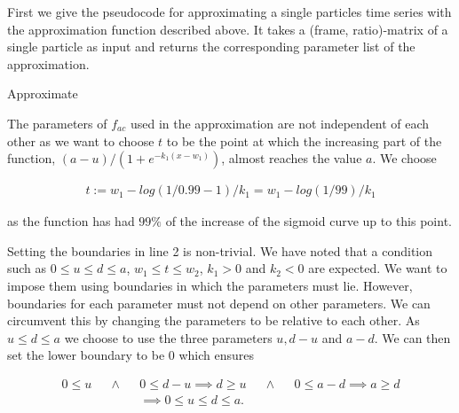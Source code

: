 First we give the pseudocode for approximating a single particles time series with the approximation function described above. It takes a (frame, ratio)-matrix of a single particle as input and returns the corresponding parameter list of the approximation.

\begin{algorithm}[H] \label{alg:approximate}
	\SetAlgoLined
	\DontPrintSemicolon
	\LinesNumbered
	\caption{Approximate}
	
	
	\BlankLine
\end{algorithm}
\vspace{1cm}

The parameters of $f_{ac}$ used in the approximation are not independent of each other as we want to choose $t$ to be the point at which the increasing part of the function, $(a-u)/(1+e^{-k_1(x-w_1)})$, almost reaches the value $a$. We choose

\begin{align*}
	t := w_1 - log(1/0.99-1) / k_1 = w_1 - log(1/99) / k_1
\end{align*}

as the function has had $99\%$ of the increase of the sigmoid curve up to this point.

Setting the boundaries in line 2 is non-trivial. We have noted that a condition such as $0 \leq u \leq d \leq a$, $w_1 \leq t \leq w_2$, $k_1 > 0$ and $k_2 < 0$ are expected. We want to impose them using boundaries in which the parameters must lie. However, boundaries for each parameter must not depend on other parameters. We can circumvent this by changing the parameters to be relative to each other. As $u \leq d \leq a$ we choose to use the three parameters $u, d-u$ and $a-d$. We can then set the lower boundary to be $0$ which ensures

\begin{align*}
	0 \leq u &&\land &&0 \leq d - u \implies d \geq u &&\land &&0 \leq a - d \implies a \geq d\\
	&& &&\implies 0 \leq u \leq d \leq a.
\end{align*}

